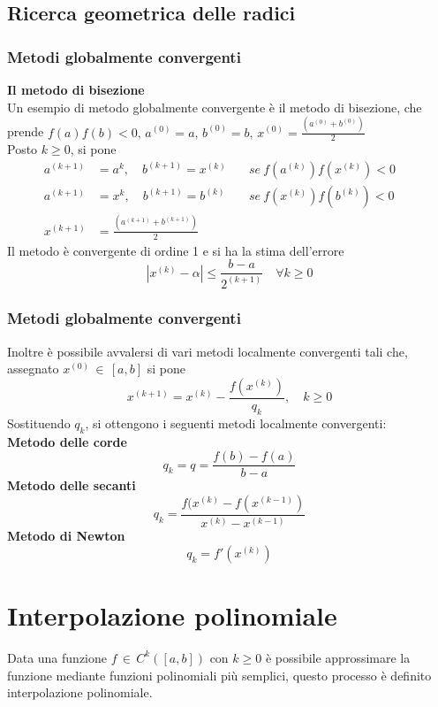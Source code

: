 \documentclass[a4paper,12pt]{article}
\begin{document}
\subsection{Ricerca geometrica delle radici}
\subsubsection{Metodi globalmente convergenti}
\textbf{Il metodo di bisezione} \\
Un esempio di metodo globalmente convergente è il metodo di bisezione, che prende $f(a)f(b) < 0, \, a^{(0)} = a, \, b^{(0)} = b, \, x^{(0)} = \frac{(a^{(0)}+b^{(0)})}{2}$ \\
Posto $k \geq 0$, si pone
\begin{align*}
a^{(k+1)}  & = a^{k}, \quad b^{(k+1)} = x^{(k)} \quad & se \ f(a^{(k)})f(x^{(k)}) < 0 && \\
a^{(k+1)}  & = x^{k}, \quad b^{(k+1)} = b^{(k)} \quad  & se \ f(x^{(k)})f(b^{(k)}) < 0  \\
x^{(k+1)} & = \frac{(a^{(k+1)} + b^{(k+1)})}{2}
\end{align*}
Il metodo è convergente di ordine 1 e si ha la stima dell'errore
$$|x^{(k)}-\alpha| \leq \frac{b-a}{2^{(k+1)}} \quad \forall k \geq 0$$
\subsubsection{Metodi globalmente convergenti}
Inoltre è possibile avvalersi di vari metodi localmente convergenti tali che, assegnato $x^{(0)} \, \in \, [a, b]$ si pone $$
x^{(k+1)} = x^{(k)}-\frac{f(x^{(k)})}{q_k}, \quad k \geq 0
$$
Sostituendo $q_k$, si ottengono i seguenti metodi localmente convergenti: \\
\textbf{Metodo delle corde} \\
$$q_k = q = \frac{f(b) - f(a)}{b - a}$$
\textbf{Metodo delle secanti} \\
$$q_k = \frac{f(x^{(k)}-f(x^{(k-1)})}{x^{(k)}-x^{(k-1)}}$$
\textbf{Metodo di Newton}
$$q_k = f'(x^{(k)})$$
\section{Interpolazione polinomiale}
Data una funzione $f \, \in \, C^{k}([a, b])$ con $k \geq 0$ è possibile approssimare la funzione mediante funzioni polinomiali più semplici, questo processo è definito interpolazione polinomiale.
\end{document}
